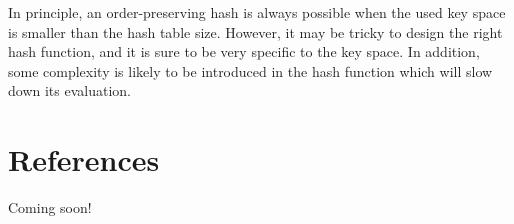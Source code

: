 \documentclass[12pt]{article}
\begin{document}
In principle, an order-preserving hash is always possible when the used key space is smaller than the hash table size.  However, it may be tricky to design the right hash function, and it is sure to be very specific to the key space.  In addition, some complexity is likely to be introduced in the hash function which will slow down its evaluation.

\section{References}

Coming soon!
\end{document}
